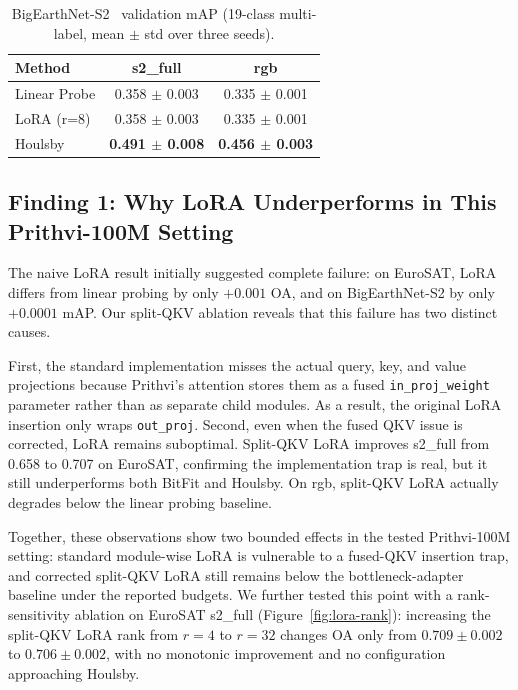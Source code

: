 \documentclass[11pt]{article}
\begin{document}
\begin{table}[t]
\centering
\caption{BigEarthNet-S2~\cite{sumbul2019bigearthnet} validation mAP (19-class multi-label, mean $\pm$ std over three seeds).}
\label{tab:bigearthnet-main}
\begin{tabular}{lcc}
\toprule
Method & s2\_full & rgb \\
\midrule
Linear Probe & 0.358 $\pm$ 0.003 & 0.335 $\pm$ 0.001 \\
LoRA (r=8) & 0.358 $\pm$ 0.003 & 0.335 $\pm$ 0.001 \\
Houlsby & \textbf{0.491 $\pm$ 0.008} & \textbf{0.456 $\pm$ 0.003} \\
\bottomrule
\end{tabular}
\end{table}

\subsection{Finding 1: Why LoRA Underperforms in This Prithvi-100M Setting}
The naive LoRA result initially suggested complete failure: on EuroSAT, LoRA differs from linear probing by only $+0.001$ OA, and on BigEarthNet-S2 by only $+0.0001$ mAP. Our split-QKV ablation reveals that this failure has two distinct causes.

First, the standard implementation misses the actual query, key, and value projections because Prithvi's attention stores them as a fused \texttt{in\_proj\_weight} parameter rather than as separate child modules. As a result, the original LoRA insertion only wraps \texttt{out\_proj}. Second, even when the fused QKV issue is corrected, LoRA remains suboptimal. Split-QKV LoRA improves s2\_full from 0.658 to 0.707 on EuroSAT, confirming the implementation trap is real, but it still underperforms both BitFit and Houlsby. On rgb, split-QKV LoRA actually degrades below the linear probing baseline.

Together, these observations show two bounded effects in the tested Prithvi-100M setting: standard module-wise LoRA is vulnerable to a fused-QKV insertion trap, and corrected split-QKV LoRA still remains below the bottleneck-adapter baseline under the reported budgets. We further tested this point with a rank-sensitivity ablation on EuroSAT s2\_full (Figure~\ref{fig:lora-rank}): increasing the split-QKV LoRA rank from $r=4$ to $r=32$ changes OA only from $0.709 \pm 0.002$ to $0.706 \pm 0.002$, with no monotonic improvement and no configuration approaching Houlsby.
\end{document}
